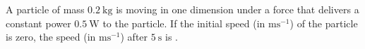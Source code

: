 

    \item A particle of mass \(0.2\ \text{kg}\) is moving in one dimension under a force that delivers a constant power \(0.5\ \text{W}\) to the particle. If the initial speed (in \(\text{ms}^{-1}\)) of the particle is zero, the speed (in \(\text{ms}^{-1}\)) after \(5\ \text{s}\) is \underline{\hspace{2.5 cm}}.

